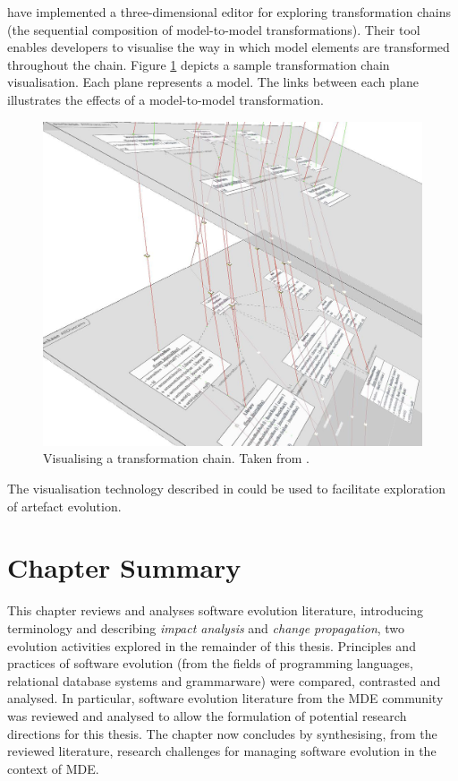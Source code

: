 \cite{pilgrim08constructing} have implemented a three-dimensional editor for exploring transformation chains (the sequential composition of model-to-model transformations). Their tool enables developers to visualise the way in which model elements are transformed throughout the chain. Figure \ref{fig:transformation-chains} depicts a sample transformation chain visualisation. Each plane represents a model. The links between each plane illustrates the effects of a model-to-model transformation.

\begin{figure}[htbp]
  \begin{center}
    \leavevmode
    \includegraphics[scale=0.25]{3.LiteratureReview/images/transformation-chain.png}
  \end{center}
  \caption[Visualising a transformation chain]{Visualising a transformation chain. Taken from \cite{pilgrim08constructing}.}
  \label{fig:transformation-chains}
\end{figure}

The visualisation technology described in \cite{pilgrim08constructing} could be used to facilitate exploration of artefact evolution.

\section{Chapter Summary}
\label{sec:literature_review_summary}
This chapter reviews and analyses software evolution literature, introducing terminology and describing \emph{impact analysis} and \emph{change propagation}, two evolution activities explored in the remainder of this thesis. Principles and practices of software evolution (from the fields of programming languages, relational database systems and grammarware) were compared, contrasted and analysed. In particular, software evolution literature from the MDE community was reviewed and analysed to allow the formulation of potential research directions for this thesis. The chapter now concludes by synthesising, from the reviewed literature, research challenges for managing software evolution in the context of MDE.

